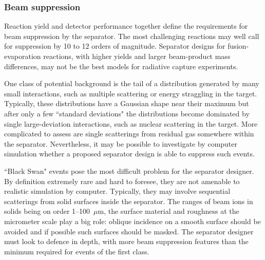 \subsubsection{Beam suppression}
Reaction yield and detector performance together define the requirements for beam suppression by the separator.    The most challenging reactions  may well call for suppression by 10 to 12 orders of magnitude.    Separator designs for fusion-evaporation reactions, with higher yields and larger beam-product mass differences, may not be the best models  for radiative capture experiments.   
    
 One class of potential background is the tail of a  distribution generated by many small interactions, such as multiple scattering or energy straggling in the target.    Typically, these distributions have a Gaussian shape near their maximum but after only a few  ``standard deviations" the distributions become dominated by single large-deviation interactions, such as nuclear scattering in the target.    More complicated to assess are single scatterings from residual gas somewhere within the separator.   Nevertheless, it may be possible to investigate by computer simulation whether  a proposed separator design is able to suppress such events.
 
  ``Black Swan" events pose the most difficult problem for the separator designer.   By definition extremely rare and hard to foresee,  they are not  amenable to realistic simulation by computer.   Typically, they may involve sequential scatterings from  solid surfaces inside the separator.   The ranges of beam ions in solids being on order 1--100~$\mu$m, the surface material and roughness at the micrometer scale play a big role: oblique incidence on a smooth surface should be avoided and if possible such surfaces should be masked.   The separator designer must look to defence in depth, with more beam suppression features than the minimum required for events of the first  class.

